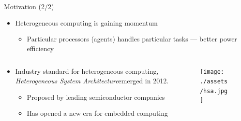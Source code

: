 \documentclass[handout]{beamer}
\begin{document}
\begin{CJK}{UTF8}{bkai}
    \begin{frame}{Motivation (2/2)}
                \begin{itemize}
                    \pause
                    \item {
                            Heterogeneous computing is gaining momentum
                            \begin{itemize}
                                \item Particular processors (agents) handles particular tasks --- better power efficiency
                            \end{itemize}
                        }
                \end{itemize}
                \pause
                \begin{columns}
                    \begin{column}{0.75\textwidth}
                        \begin{itemize}
                            \item {
                                    Industry standard for heterogeneous computing, \textit{Heterogeneous System Architecture}\footnotemark emerged in 2012.
                                    \begin{itemize}
                                        \item {
                                                Proposed by leading semiconductor companies%
                                            }
                                        \item {
                                                Has opened a new era for embedded computing %
                                            }
                                    \end{itemize}
                                }
                        \end{itemize}
                    \end{column}
                    \begin{column}{0.25\textwidth}
                            \begin{figure}[!ht]
                                \centering
                                \texttt{[image: ./assets/hsa.jpg]}
                            \end{figure}
                    \end{column}
                \end{columns}

\end{frame}
\end{CJK}
\end{document}
